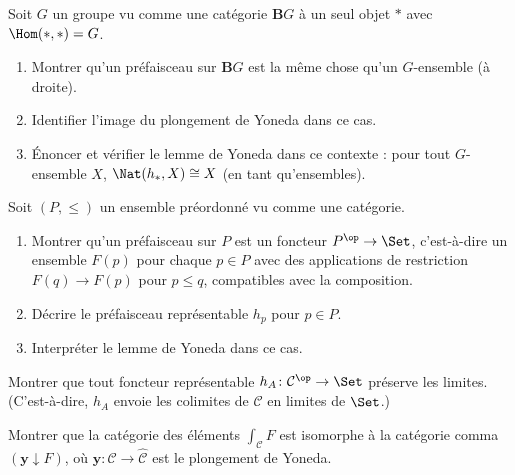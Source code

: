\begin{exercice}\label{exo:yoneda-groupes}
Soit $G$ un groupe vu comme une catégorie $\mathbf{B}G$ à un seul objet
$*$ avec $\Hom(*, *) = G$.
\begin{enumerate}[label=(\alph*)]
\item Montrer qu'un préfaisceau sur $\mathbf{B}G$ est la même chose
    qu'un $G$-ensemble (à droite).
\item Identifier l'image du plongement de Yoneda dans ce cas.
\item Énoncer et vérifier le lemme de Yoneda dans ce contexte :
    pour tout $G$-ensemble $X$,
    $\Nat(h_*, X) \cong X$ (en tant qu'ensembles).
\end{enumerate}
\end{exercice}

\begin{exercice}\label{exo:yoneda-preordre}
Soit $(P, \leq)$ un ensemble préordonné vu comme une catégorie.
\begin{enumerate}[label=(\alph*)]
\item Montrer qu'un préfaisceau sur $P$ est un foncteur
    $P^{\op} \to \Set$, c'est-à-dire un ensemble $F(p)$ pour chaque
    $p \in P$ avec des applications de restriction
    $F(q) \to F(p)$ pour $p \leq q$, compatibles avec la composition.
\item Décrire le préfaisceau représentable $h_p$ pour $p \in P$.
\item Interpréter le lemme de Yoneda dans ce cas.
\end{enumerate}
\end{exercice}

\begin{exercice}\label{exo:representable-limites}
Montrer que tout foncteur représentable $h_A \colon \mathcal{C}^{\op} \to \Set$
préserve les limites. (C'est-à-dire, $h_A$ envoie les colimites de
$\mathcal{C}$ en limites de $\Set$.)
\end{exercice}

\begin{exercice}\label{exo:elements-comma}
Montrer que la catégorie des éléments $\int_{\mathcal{C}} F$ est isomorphe
à la catégorie comma $(\mathbf{y} \downarrow F)$, où
$\mathbf{y} \colon \mathcal{C} \to \widehat{\mathcal{C}}$ est le plongement
de Yoneda.
\end{exercice}

